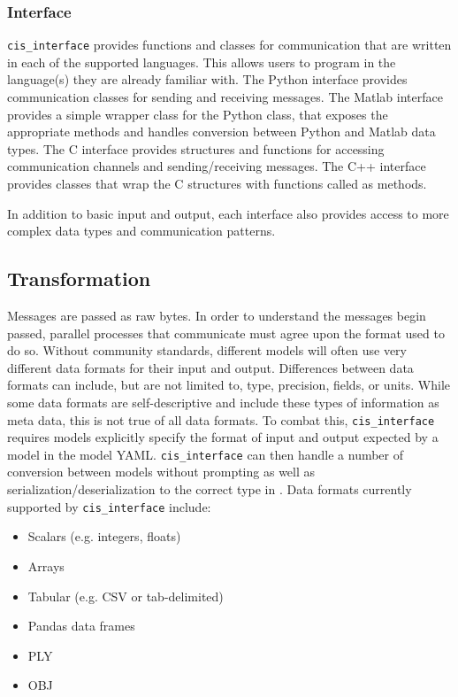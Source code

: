 \documentclass[journal]{IEEEtran}
\newcommand{\cis}{{\tt cis\_interface}{}}
\begin{document}
\subsubsection{Interface}\label{SSS:interface}
%
{\cis} provides functions and classes for communication that are 
written in each of the supported languages. This allows users to program in the 
language(s) they are already familiar with. The Python interface provides 
communication classes for sending and receiving messages. The Matlab 
interface provides a simple wrapper class for the Python class, that exposes 
the appropriate methods and handles conversion between Python and Matlab 
data types. The C interface provides structures and functions for accessing 
communication channels and sending/receiving messages. The C++ interface 
provides classes that wrap the C structures with functions called as methods.

In addition to basic input and output, each interface also provides access 
to more complex data types and communication patterns.


%
\subsection{Transformation}\label{SS:transformation}
%
%
Messages are passed as raw bytes. In order to understand the messages begin passed, parallel processes that communicate must agree upon the format used to do so. Without community standards, different models will often use very different data formats for their input and output. Differences between data formats can include, but are not limited to, type, precision, fields, or units. While some data formats are self-descriptive and include these types of information as meta data, this is not true of all data formats. To combat this, {\cis} requires models explicitly specify the format of input and output expected by a model in the model YAML. {\cis} can then handle a number of conversion between models without prompting as well as serialization/deserialization to the correct type in . Data formats currently supported by {\cis} include:
%
\begin{itemize}
	\item Scalars (e.g. integers, floats)
	\item Arrays
	\item Tabular (e.g. CSV or tab-delimited)
	\item Pandas data frames
	\item PLY
	\item OBJ
\end{itemize}
\end{document}
